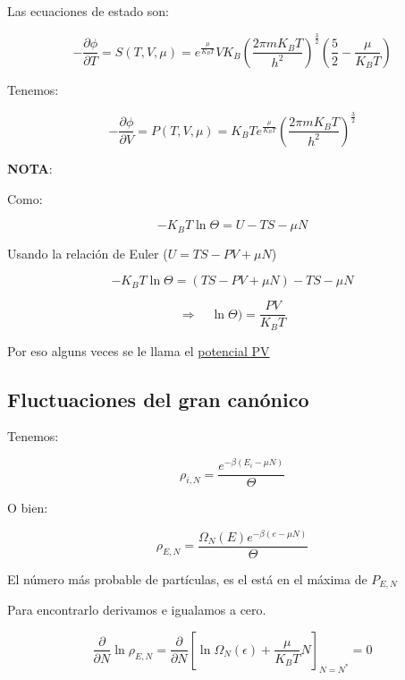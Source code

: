 \documentclass{article}
\begin{document}
Las ecuaciones de estado son:



\[   - \frac{  \partial \phi }{ \partial T }  = S(T,V,\mu) = e^{\frac{\mu}{K_{B}T}  } VK_{B} \left(  \frac{ 2\pi mK_{B}T }{h^{2}}    \right)^{ \frac{3}{2} } \left(   \frac{5}{2} - \frac{\mu}{K_{B}T}    \right)   \]



Tenemos:


\[   - \frac{  \partial \phi  }{\partial V} = P(T,V, \mu) = K_{B}T e^{ \frac{ \mu  }{K_{B}T}  }  \left( \frac{ 2\pi mK_{B}T }{h^{2} }  \right)^{\frac{3}{2}}      \]


\textbf{NOTA}:


Como:



\[  -K_{B}T\ln\Theta = U -TS - \mu{N}  \]

Usando la relación de Euler ($U=TS-PV+\mu{N} $)


\[ -K_{B}T \ln \Theta = ( TS-PV+\mu N ) -TS -\mu N   \]



\[ \Rightarrow  \quad \boxed{  \ln{\Theta} )= \frac{PV}{K_{B}T}    }  \]


Por eso alguns veces se le llama el \underline{potencial PV}


\subsection{ Fluctuaciones del gran canónico  }


Tenemos:



\[ \rho_{i,N}  =  \frac{ e^{ -\beta (E_{i} - \mu{N}) }  }{  \Theta }   \]


 O bien:
 
 
 
 \[  \rho_{E,N} = \frac{ \Omega_{N}(E) e^{  -\beta (  e-\mu{N} ) }   }{  \Theta }         \]
 
 
 
 El número más probable de partículas, es el está en el máxima de $P_{E,N}$ 



Para encontrarlo derivamos e igualamos a cero.



\[  \frac{\partial }{\partial N}  \ln \rho_{E,N} = \frac{  \partial  }{\partial N}  \left[  \ln \Omega_{N}(\epsilon) + \frac{\mu}{K_{B}T}N  \right]_{ N=N^{\ast} } =0 \]
\end{document}
